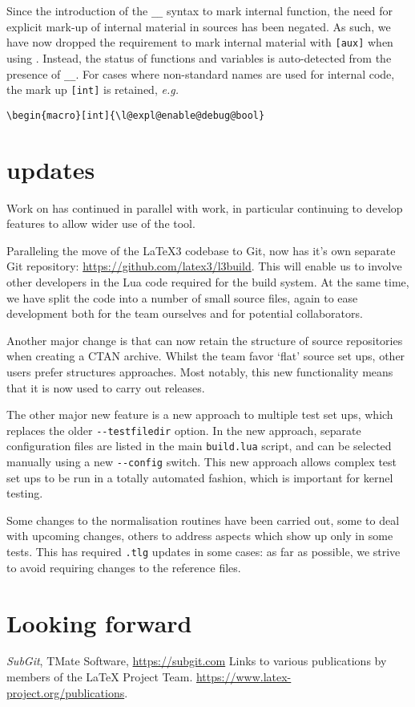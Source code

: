 \documentclass{ltnews}
\begin{document}
Since the introduction of the \verb|__| syntax to mark internal function, the
need for explicit mark-up of internal material in sources has been negated.
As such, we have now dropped the requirement to mark internal material with
\verb|[aux]| when using . Instead, the status of functions and
variables is auto-detected from the presence of \verb|__|. For cases where
non-standard names are used for internal code, the mark up \verb|[int]| is
retained, \emph{e.g.}
\begin{verbatim}
\begin{macro}[int]{\l@expl@enable@debug@bool}
\end{verbatim}

\section{ updates}

Work on  has continued in parallel with  work, in
particular continuing to develop features to allow wider use of the tool.

Paralleling the move of the \LaTeX3 codebase to Git,  now has it's
own separate Git repository: \url{https://github.com/latex3/l3build}. This will
enable us to involve other developers in the Lua code required for the build
system. At the same time, we have split the code into a number of small source
files, again to ease development both for the team ourselves and for potential
collaborators.

Another major change is that  can now retain the structure of
source repositories when creating a CTAN archive. Whilst the team favor `flat'
source set ups, other users prefer structures approaches. Most notably, this
new  functionality means that it is now used to carry out
 releases.

The other major new feature is a new approach to multiple test set ups, which
replaces the older \verb|--testfiledir| option. In the new approach, separate
configuration files are listed in the main \verb|build.lua| script, and can be
selected manually using a new \verb|--config| switch. This new approach allows
complex test set ups to be run in a totally automated fashion, which is
important for kernel testing.

Some changes to the normalisation routines have been carried out, some to deal
with upcoming  changes, others to address aspects which show up
only in some tests. This has required \verb|.tlg| updates in some cases: as far
as possible, we strive to avoid requiring changes to the reference files.

\section{Looking forward}


\begin{thebibliography}{10}
  \raggedright
    \emph{SubGit}, TMate Software, \url{https://subgit.com}
    Links to various publications by members of the \LaTeX{} Project Team.
    \newblock \url{https://www.latex-project.org/publications}.
\end{thebibliography}
\end{document}

